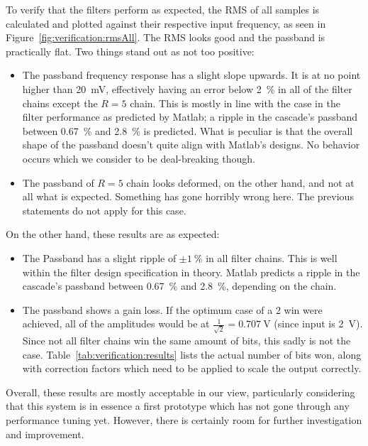 To verify  that the  filters perform as  expected, the RMS  of all  samples is
calculated and  plotted against their  respective input frequency, as  seen in
Figure~\ref{fig:verification:rmsAll}.  The RMS looks  good and the passband is
practically flat. Two things stand out as not too positive:
\begin{itemize}\tightlist
    \item 
        The passband frequency  response has a slight slope  upwards. It is at
        no  point  higher  than  \SI{20}{\mV},  effectively  having  an  error
        below  \SI{2}{\percent}  in  all  of  the  filter  chains  except  the
        $R=5$  chain.  
        This is  mostly in  line with  the case in  the filter  performance as
        predicted  by  Matlab; a  ripple  in  the cascade's  passband  between
        \SI{0.67}{\percent} and \SI{2.8}{\percent} is predicted.
        What is  peculiar is that  the overall  shape of the  passband doesn't
        quite  align  with  Matlab's  designs. No  behavior  occurs  which  we
        consider to be deal-breaking though.
    \item 
        The passband of $R=5$ chain looks deformed, on the other hand, and not
        at all what  is expected. Something has gone  horribly wrong here. The
        previous statements do not apply for this case.
\end{itemize}
On the other hand, these results are as expected:
\begin{itemize}
    \item 
        The  Passband has  a  slight ripple  of  $\pm\SI{1}{\percent}$ in  all
        filter chains.  This is well within the filter design specification in
        theory.  Matlab predicts a  ripple in the cascade's passband between
        \SI{0.67}{\percent} and \SI{2.8}{\percent}, depending on the chain.
    \item 
        The  passband   shows  a   gain  loss. If  the   optimum  case   of  a
        \SI{2}{\bit}  win   were  achieved,   all  of  the   amplitudes  would
        be   at  $\frac{1}{\sqrt{2}}   =  \SI{0.707}{\V}$   (since  input   is
        \SI{2}{V_{}}).    Since   not   all   filter   chains   win
        the   same   amount  of   bits,   this   sadly   is  not   the   case.
        Table~\ref{tab:verification:results} lists  the actual number  of bits
        won, along with  correction factors which need to be  applied to scale
        the output correctly.
\end{itemize}
Overall,  these  results  are  mostly acceptable  in  our  view,  particularly
considering that  this system is  in essence a  first prototype which  has not
gone through any performance tuning  yet. However, there is certainly room for
further investigation and improvement.

